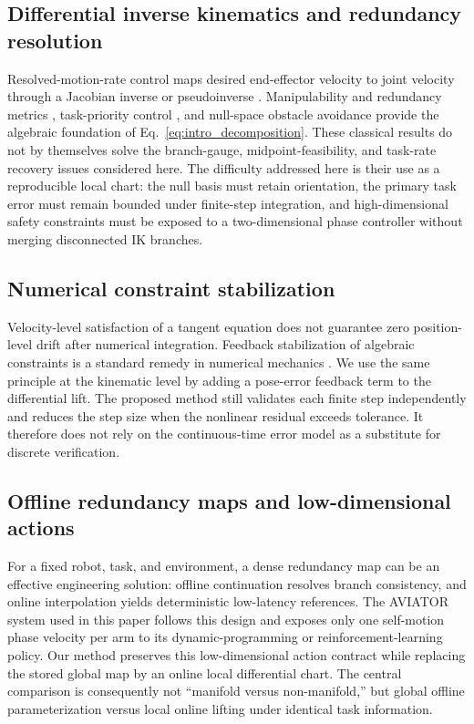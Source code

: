\documentclass[preprint,12pt]{elsarticle}
\begin{document}
\subsection{Differential inverse kinematics and redundancy resolution}

Resolved-motion-rate control maps desired end-effector velocity to joint velocity through a Jacobian inverse or pseudoinverse \cite{whitney1969}. Manipulability and redundancy metrics \cite{yoshikawa1985,nakamura1987}, task-priority control \cite{siciliano1991,chiaverini1997}, and null-space obstacle avoidance \cite{khatib1986,liegeois1977,maciejewski1985} provide the algebraic foundation of Eq.~\eqref{eq:intro_decomposition}. These classical results do not by themselves solve the branch-gauge, midpoint-feasibility, and task-rate recovery issues considered here. The difficulty addressed here is their use as a reproducible local chart: the null basis must retain orientation, the primary task error must remain bounded under finite-step integration, and high-dimensional safety constraints must be exposed to a two-dimensional phase controller without merging disconnected IK branches.

\subsection{Numerical constraint stabilization}

Velocity-level satisfaction of a tangent equation does not guarantee zero position-level drift after numerical integration. Feedback stabilization of algebraic constraints is a standard remedy in numerical mechanics \cite{baumgarte1972}. We use the same principle at the kinematic level by adding a pose-error feedback term to the differential lift. The proposed method still validates each finite step independently and reduces the step size when the nonlinear residual exceeds tolerance. It therefore does not rely on the continuous-time error model as a substitute for discrete verification.

\subsection{Offline redundancy maps and low-dimensional actions}

For a fixed robot, task, and environment, a dense redundancy map can be an effective engineering solution: offline continuation resolves branch consistency, and online interpolation yields deterministic low-latency references. The AVIATOR system used in this paper follows this design and exposes only one self-motion phase velocity per arm to its dynamic-programming or reinforcement-learning policy. Our method preserves this low-dimensional action contract while replacing the stored global map by an online local differential chart. The central comparison is consequently not ``manifold versus non-manifold,'' but global offline parameterization versus local online lifting under identical task information.
\end{document}
